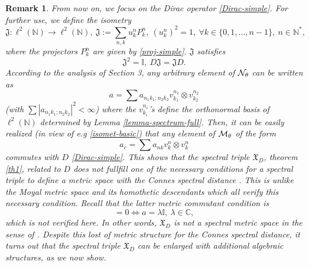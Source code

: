 \documentclass[a4paper,11pt,twoside]{article}
\numberwithin{equation}{section}
\newcommand\bbone{{ \mathbb{I}}}
\newtheorem{remark}[Theorem]{Remark}
\theoremstyle{nonumberplain}
\begin{document}
\begin{remark}
From now on, we focus on the Dirac operator \eqref{Dirac-simple}. For further use, we define the isometry
\begin{equation}
\mathfrak{J}:\ell^2(\mathbb{N})\to\ell^2(\mathbb{N}),\ \mathfrak{J}:=\sum_{n,k}u^n_kP^n_k,\ (u^n_k)^2=1,\ \forall k\in\{0,1,...,n-1\},\ n\in\mathbb{N}^*\label{isomet-basic},
\end{equation}
where the projectors $P^n_k$ are given by \eqref{proj-simple}. $\mathfrak{J}$ satisfies
\begin{equation}
\mathfrak{J}^2=\bbone,\ D\mathfrak{J}=\mathfrak{J}D\label{commut-1}. 
\end{equation}
According to the analysis of Section 3, any arbitrary element of ${\cal{N}}_\theta$ can be written as 
\begin{equation}
a=\sum a_{n_1k_1;n_2k_2}v^{n_1}_{k_1}\otimes v^{n_2}_{k_2}
\end{equation}
(with $\sum |a_{n_1k_1;n_2k_2} |^2<\infty$) where the $v^{n_i}_{k_i}$'s define the orthonormal basis of $\ell^2(\mathbb{N})$ determined by Lemma \ref{lemma-spectrum-full}. Then, it can be easily realized (in view of e.g \eqref{isomet-basic}) that any element of ${\cal{M}}_\theta$ of the form 
\begin{equation}
a_c=\sum a_{nk}v^n_k\otimes v^n_k 
\end{equation}
commutes with $D$ \eqref{Dirac-simple}. This shows that the spectral triple $\mathfrak{X}_D$, theorem \ref{th1}, related to $D$ does not fullfill one of the necessary conditions for a spectral triple to define a metric space with the Connes spectral distance \cite{Rieffel}. This is unlike the Moyal metric space and its homothetic descendants which all verify this necessary condition. Recall that the latter metric commutant condition is 
\begin{equation}
[D,\eta(a)]=0\iff a=\lambda\bbone,\ \lambda\in\mathbb{C},
\end{equation}
which is not verified here. In other words, $\mathfrak{X}_D$ is not a spectral metric space in the sense of \cite{homot-moyal,bel-mar}. Despite this lost of metric structure for the Connes spectral distance, it turns out that the spectral triple $\mathfrak{X}_D$ can be enlarged with additional algebraic structures, as we now show.
\end{remark}
\end{document}
